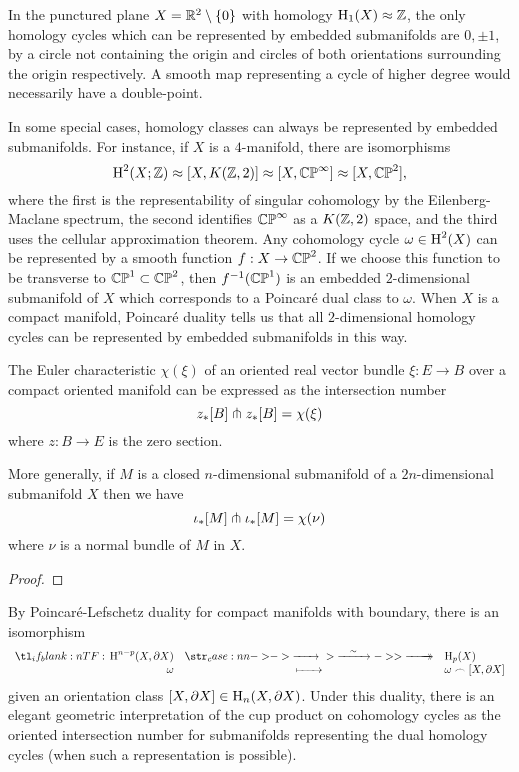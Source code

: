 \begin{example}
  In the punctured plane $X=\mathbb{R}^2\setminus \{0\}$ with homology $\operatorname{H}_1(X)\approx \mathbb{Z}$, the only homology cycles which can be represented by embedded submanifolds are $0,\pm 1$, by a circle not containing the origin and circles of both orientations surrounding the origin respectively. A smooth map representing a cycle of higher degree would necessarily have a double-point.
\end{example}

\begin{remark}
	In some special cases, homology classes can always be represented by embedded submanifolds. For instance, if $X$ is a $4$-manifold, there are isomorphisms
	\[
		\operatorname{H}^2(X; \mathbb{Z}) \approx [X, K(\mathbb{Z},2)] \approx [X, \mathbb{CP}^\infty] \approx [X,\mathbb{CP}^2],
	\]
	where the first is the representability of singular cohomology by the Eilenberg-Maclane spectrum, the second identifies $\mathbb{CP}^\infty$ as a $K(\mathbb{Z},2)$ space, and the third uses the cellular approximation theorem. Any cohomology cycle $\omega\in \operatorname{H}^2(X)$ can be represented by a smooth function $f : X \to \mathbb{CP}^2$. If we choose this function to be transverse to $\mathbb{CP}^1\subset \mathbb{CP}^2$, then $f^{-1}(\mathbb{CP}^1)$ is an embedded $2$-dimensional submanifold of $X$ which corresponds to a Poincar\'e dual class to $\omega$. When $X$ is a compact manifold, Poincar\'e duality tells us that all $2$-dimensional homology cycles can be represented by embedded submanifolds in this way.
\end{remark}

\begin{theorem}\label{thm:euler-characteristic-intersection-number}
	The Euler characteristic $\chi(\xi)$ of an oriented real vector bundle $\xi : E \to B$ over a compact oriented manifold can be expressed as the intersection number
	\[
		z_*[B]\pitchfork z_*[B] = \chi(\xi)
	\]
	where $z : B \to E$ is the zero section.

	More generally, if $M$ is a closed $n$-dimensional submanifold of a $2n$-dimensional submanifold $X$ then we have
	\[
		\iota_*[M]\pitchfork \iota_*[M] = \chi(\nu)
	\]
	where $\nu$ is a normal bundle of $M$ in $X$.
\end{theorem}
\begin{proof}
\end{proof}

By Poincar\'e-Lefschetz duality for compact manifolds with boundary, there is an isomorphism
\[
	\lkxfunc{}{\H^{n-p}(X,\partial X)}{\H_p(X)}{\omega}{\omega\frown [X,\partial X]}
\]
given an orientation class $[X,\partial X]\in \operatorname{H}_n(X, \partial X)$. Under this duality, there is an elegant geometric interpretation of the cup product on cohomology cycles as the oriented intersection number for submanifolds representing the dual homology cycles (when such a representation is possible).

